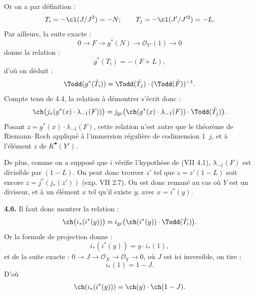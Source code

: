 Or on a par
définition :
\[
 T_i=-\cl(J/J^2)=-N;\qquad
 T_j=-\cl(J'/J'^2)=-L.
\]
Par ailleurs, la suite exacte :
\[
0\longrightarrow F\longrightarrow g^*(N)\longrightarrow \mathcal O_{Y'}(1)\longrightarrow0
\]
donne la relation :
\[
 g^*(T_i)=-(F+L),
\]
d'où on déduit :
\[
 \Todd(g^*(\check T_i))=\Todd(\check T_j)\cdot(\Todd(\check F))^{-1}.
\]
Compte tenu de 4.4, la relation à démontrer s'écrit donc :
\[
 \ch\bigl(j_*(g^*(x)\cdot\lambda_{-1}(F))\bigr)
 =
 j_{\mathrm{gr}}\bigl(\ch(g^*(x)\cdot\lambda_{-1}(F))\cdot\Todd(\check T_j)\bigr).
\]
Posant \(z=g^*(x)\cdot\lambda_{-1}(F)\), cette relation n'est autre que le théorème de Riemann--Roch appliqué à l'immersion régulière de codimension \(1\)~\(j\), et à l'élément \(z\) de \(K^{\bullet}(Y')\).

De plus, comme on a supposé que \(i\) vérifie l'hypothèse de (VII 4.1), \(\lambda_{-1}(F)\) est divisible par \((1-L)\). On peut donc trouver \(z'\) tel que \(z=z'(1-L)\) soit encore \(z=j^*(j_*(z'))\) (exp. VII 2.7). On est donc remané au cas où \(Y\) est un diviseur, et à un élément \(x\) tel qu'il existe \(y\), avec \(x=i^*(y)\).

\textbf{4.6.} Il faut donc montrer la relation :
\[
 \ch\bigl(i_*(i^*(y))\bigr)
 =
 i_{\mathrm{gr}}\bigl(\ch(i^*(y))\cdot\Todd(\check T_i)\bigr).
\]
Or la formule de projection donne :
\[
 i_*(i^*(y))=y\cdot i_*(1),
\]
et de la suite exacte : \(0\longrightarrow J\longrightarrow\mathcal O_X\longrightarrow\mathcal O_Y\longrightarrow0\), où \(J\) est ici inversible, on tire :
\[
 i_*(1)=1-J.
\]
D'où
\[
 \ch(i_*(i^*(y)))=\ch(y)\cdot\ch(1-J).
\]
